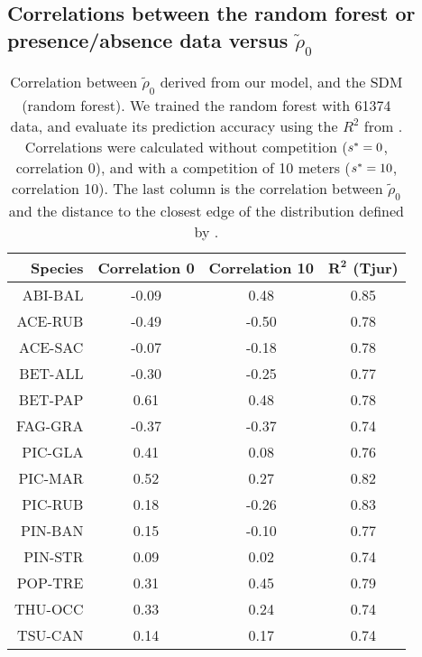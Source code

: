 \begin{refsection}
\subsection{Correlations between the random forest or presence/absence data versus $ \tilde \rho_0 $}
\begin{table}[ht]
\centering
\caption{Correlation between $ \tilde \rho_0 $ derived from our model, and the SDM (random forest). We trained the random forest with \num{61374} data, and evaluate its prediction accuracy using the $ R^2 $ from \citet{Tjur2009}. Correlations were calculated without competition (\ie $ {s}^{*} = 0 $, correlation 0), and with a competition of 10 meters (\ie $ {s}^{*} = 10 $, correlation 10). The last column is the correlation between $ \tilde \rho_0 $ and the distance to the closest edge of the distribution defined by \citet{Little1971}. \label{tab::R0correlSDM}}
\begin{tabular}{@{}rccc@{}}
	\toprule
	\textbf{Species} & \textbf{Correlation 0} & \textbf{Correlation 10} & $ \bm{R^2} $ \textbf{(Tjur)} \\
	\midrule
		ABI-BAL & -0.09 & 0.48 & 0.85 \\
		ACE-RUB & -0.49 & -0.50 & 0.78 \\
		ACE-SAC & -0.07 & -0.18 & 0.78 \\
		BET-ALL & -0.30 & -0.25 & 0.77 \\
		BET-PAP & 0.61 & 0.48 & 0.78 \\
		FAG-GRA & -0.37 & -0.37 & 0.74 \\
		PIC-GLA & 0.41 & 0.08 & 0.76 \\
		PIC-MAR & 0.52 & 0.27 & 0.82 \\
		PIC-RUB & 0.18 & -0.26 & 0.83 \\
		PIN-BAN & 0.15 & -0.10 & 0.77 \\
		PIN-STR & 0.09 & 0.02 & 0.74 \\
		POP-TRE & 0.31 & 0.45 & 0.79 \\
		THU-OCC & 0.33 & 0.24 & 0.74 \\
		TSU-CAN & 0.14 & 0.17 & 0.74 \\
	\bottomrule
\end{tabular}
\end{table}


\end{refsection}
